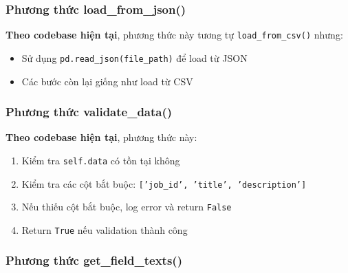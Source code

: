 \subsubsection{Phương thức load\_from\_json()}

\textbf{Theo codebase hiện tại}, phương thức này tương tự \texttt{load\_from\_csv()} nhưng:
\begin{itemize}
    \item Sử dụng \texttt{pd.read\_json(file\_path)} để load từ JSON
    \item Các bước còn lại giống như load từ CSV
\end{itemize}

\subsubsection{Phương thức validate\_data()}

\textbf{Theo codebase hiện tại}, phương thức này:
\begin{enumerate}
    \item Kiểm tra \texttt{self.data} có tồn tại không
    \item Kiểm tra các cột bắt buộc: \texttt{['job\_id', 'title', 'description']}
    \item Nếu thiếu cột bắt buộc, log error và return \texttt{False}
    \item Return \texttt{True} nếu validation thành công
\end{enumerate}

\subsubsection{Phương thức get\_field\_texts()}

